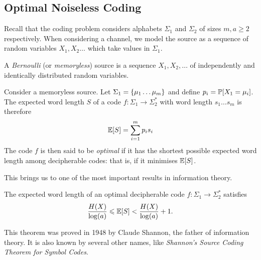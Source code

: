 \documentclass{article}
\begin{document}
\subsection{Optimal Noiseless Coding}
\label{section-noiseless-optimal-coding}

Recall that the coding problem considers alphabets $\Sigma_1$ and $\Sigma_2$
of sizes $m, a \geq 2$ respectively.
When considering a channel,
we model the source as a sequence of random variables $X_1, X_2 \dots$
which take values in $\Sigma_1$.

\begin{definition}
	\label{memoryless-source}
    A \textit{Bernoulli} (or \textit{memoryless}) source
    is a sequence $X_1, X_2, \dots$
    of independently and identically distributed random variables.
\end{definition}

\begin{definition}
	\label{optimal-code}
    Consider a memoryless source.
    Let $\Sigma_1 = \set{\mu_1 \dots \mu_m}$
    and define $p_i = \P[X_1 = \mu_i]$.
    The expected word length $S$ of a code $f : \Sigma_1 \to \Sigma_2^*$
    with word length $s_1 \dots s_m$ is therefore
	\[
	\E[S] = \sum_{i=1}^m p_i s_i
	\]
	The code $f$ is then said to be \textit{optimal}
	if it has the shortest possible expected word length among decipherable codes:
	that is, if it minimises $\E[S]$.
\end{definition}

This brings us to one of the most important results in information theory.

\begin{theorem}
	\label{shannon-noiseless-coding-theorem}
    The expected word length of an optimal decipherable code
    $f: \Sigma_1 \to \Sigma_2^*$ satisfies
    \[
	\frac{H(X)}{\log (a)}
	\leq \E[S] <
	\frac{H(X)}{\log (a)} + 1.
	\]
\end{theorem}

This theorem was proved in 1948 by Claude Shannon,
the father of information theory.
It is also known by several other names,
like \textit{Shannon's Source Coding Theorem for Symbol Codes}.
\end{document}
